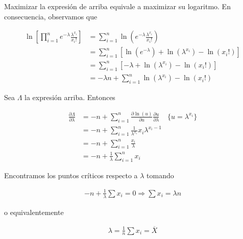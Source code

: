 \documentclass[a4paper, 12pt]{article}
\begin{document}
Maximizar la expresión de arriba equivale a maximizar su logaritmo. En
consecuencia, observamos que

\begin{align*}
    \ln \left[\prod_{i=1}^{n} e^{-\lambda} \frac{\lambda^{x_i}}{x_i!}\right] &=
    \sum_{i=1}^{n} \ln \left( e^{-\lambda} \frac{\lambda^{x_i}}{x_i!} \right) 
    \\
    &=
    \sum_{i=1}^{n} \left[\ln(e^{-\lambda}) +    \ln\left(    \lambda^{x_i}
    \right)-\ln\left(x_i!\right)\right]\\ 
    &= \sum_{i=1}^{n} \left[- \lambda + \ln(\lambda^{x_i}) - \ln\left( x_i !
    \right) \right] \\ 
    &=- \lambda n + \sum_{i=1}^{n} \ln(\lambda^{x_i}) - \ln(x_i!)
\end{align*}

Sea $\Lambda$ la expresión arriba. Entonces

\begin{align*}
    \frac{\partial \Lambda}{\partial \lambda } &= -n + \sum_{i=1}^{n}
    \frac{\partial \ln(u) }{\partial u } \frac{\partial u}{\partial \lambda} &
    \{u = \lambda^{x_i}\} \\ 
                                                                             &=
                                                                             -n
                                                                             +
                                                                             \sum_{i=1}^{n}
                                                                             \frac{1}{\lambda^{x_i}}x_i
                                                                             \lambda^{x_i
                                                                             -
                                                                         1} \\ 
    &= -n + \sum_{i=1}^{n} \frac{x_i}{\lambda} \\ 
    &= -n + \frac{1}{\lambda}  \sum_{i=1}^{n} x_i
\end{align*}

Encontramos los puntos críticos respecto a $\lambda$ tomando 

\begin{align*}
    -n + \frac{1}{\lambda} \sum x_i = 0 \Rightarrow \sum x_i = \lambda n
\end{align*}

o equivalentemente 

\begin{align*}
    \lambda = \frac{1}{n}\sum x_i = \overline{X}
\end{align*}
\end{document}
